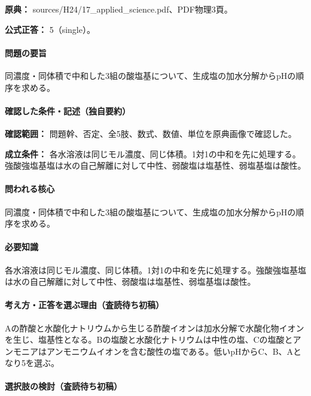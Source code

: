 \noindent\textbf{原典：} sources/H24/17\_applied\_science.pdf、PDF物理3頁。

\textbf{公式正答：} 5（single）。

\paragraph{問題の要旨} 同濃度・同体積で中和した3組の酸塩基について、生成塩の加水分解からpHの順序を求める。

\paragraph{確認した条件・記述（独自要約）}\mbox{}\par

\noindent\textbf{確認範囲：} 問題幹、否定、全5肢、数式、数値、単位を原典画像で確認した。\par

\noindent\textbf{成立条件：} 各水溶液は同じモル濃度、同じ体積。1対1の中和を先に処理する。強酸強塩基塩は水の自己解離に対して中性、弱酸塩は塩基性、弱塩基塩は酸性。\par

\paragraph{問われる核心} 同濃度・同体積で中和した3組の酸塩基について、生成塩の加水分解からpHの順序を求める。

\paragraph{必要知識} 各水溶液は同じモル濃度、同じ体積。1対1の中和を先に処理する。強酸強塩基塩は水の自己解離に対して中性、弱酸塩は塩基性、弱塩基塩は酸性。

\paragraph{考え方・正答を選ぶ理由（査読待ち初稿）} Aの酢酸と水酸化ナトリウムから生じる酢酸イオンは加水分解で水酸化物イオンを生じ、塩基性となる。Bの塩酸と水酸化ナトリウムは中性の塩、Cの塩酸とアンモニアはアンモニウムイオンを含む酸性の塩である。低いpHからC、B、Aとなり5を選ぶ。

\paragraph{選択肢の検討（査読待ち初稿）}\mbox{}\par

